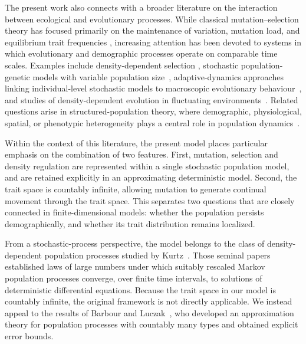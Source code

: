 \documentclass[12pt]{article}
\begin{document}
The present work also connects with a broader literature on the
interaction between ecological and evolutionary processes. While
classical mutation--selection theory has focused primarily on the
maintenance of variation, mutation load, and equilibrium trait
frequencies \cite{Burger2003,CrowKimura1970,Ewens2004}, increasing
attention has been devoted to systems in which evolutionary and
demographic processes operate on comparable time scales. Examples
include density-dependent selection
\cite{Christiansen,TravisEtAl2023}, stochastic population-genetic models
with variable population size~\cite{Parsons2010}, adaptive-dynamics
approaches linking individual-level stochastic models to macroscopic
evolutionary behaviour~\cite{ChampagnatFerriereMeleard}, and studies of
density-dependent evolution in fluctuating
environments~\cite{Lande2009}. Related questions arise in
structured-population theory, where demographic, physiological, spatial,
or phenotypic heterogeneity plays a central role in population
dynamics~\cite{Diekmann2021,Webb1985}.

Within the context of this literature, the present model places
particular emphasis on the combination of two features. First, mutation,
selection and density regulation are represented within a single
stochastic population model, and are retained explicitly in an
approximating deterministic model. Second, the trait space is countably
infinite, allowing mutation to generate continual movement through the trait
space. This separates two questions that are closely connected in
finite-dimensional models: whether the population persists
demographically, and whether its trait distribution remains localized.

From a stochastic-process perspective, the model belongs to the class
of density-dependent population processes studied by
Kurtz~\cite{Kur70,Kur71}. Those seminal papers established laws of large
numbers under which suitably rescaled Markov population processes
converge, over finite time intervals, to solutions of deterministic
differential equations. Because the trait space in our model is
countably infinite, the original framework is not directly applicable.
We instead appeal to the results of Barbour and
Luczak~\cite{BL12b}, who developed an approximation theory for
population processes with countably many types and obtained explicit
error bounds.
\end{document}
